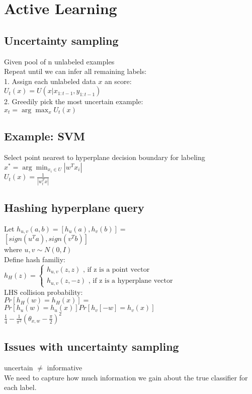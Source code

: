 \section{Active Learning}
\subsection*{Uncertainty sampling}
Given pool of n unlabeled examples\\
Repeat until we can infer all remaining labels:\\
1. Assign each unlabeled data $x$ an score:\\
$U_t(x) = U(x|x_{1:t-1}, y_{1:t-1})$\\
2. Greedily pick the most uncertain example:\\
$x_t = \arg\max_x U_t(x)$

\subsection*{Example: SVM}
Select point nearest to hyperplane decision boundary for labeling\\
$x^* = \arg \min_{x_i \in U} |w^T x_i|$\\
$U_t(x) = \frac{1}{|w_t^T x|}$

\subsection*{Hashing hyperplane query}
Let $h_{u,v}(a,b) = [h_u(a), h_v(b)] =$\\
$[sign(u^T a), sign(v^T b)]$\\
where $u,v \sim N(0,I)$\\
Define hash familiy:\\
$h_{H}(z) =
\begin{cases}
	h_{u,v}(z,z) \text{ , if z is a point vector}\\
	h_{u,v}(z,-z) \text{ , if z is a hyperplane vector}
\end{cases}$\\
LHS collision probability:\\
$Pr[h_{H}(w) = h_{H}(x)] =$\\
$Pr[h_u(w) = h_u(x)]Pr[h_v[-w]=h_v(x)]$\\
$\frac{1}{4}-\frac{1}{\pi^2}(\theta_{x,w} - \frac{\pi}{2})^2$

\subsection*{Issues with uncertainty sampling}
uncertain $\not =$ informative\\
We need to capture how much information we gain about the true classifier for each label.

